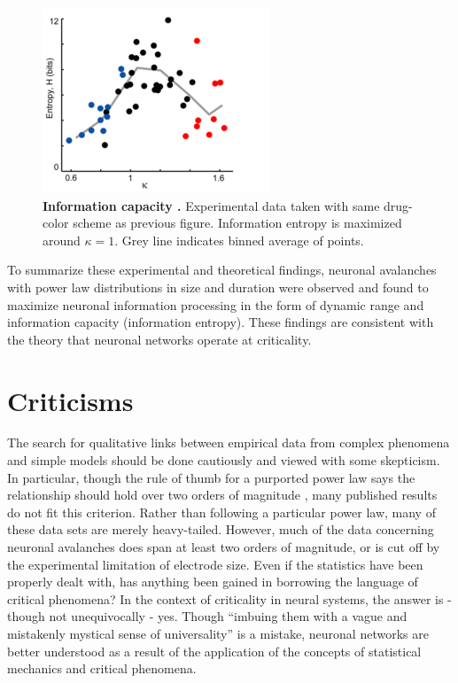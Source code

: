 \documentclass[12pt]{article}
\begin{document}
\begin{figure}      
  \begin{center}    
 \includegraphics[width=.50\textwidth]{entropyplenz}    
    \caption{\textbf{Information capacity \cite{Shew2011a}.} Experimental data taken with same drug-color scheme as previous figure. Information entropy is maximized around $\kappa = 1$. Grey line indicates binned average of points.}
   \label{Figure::Entropy / information maximized experimental}   
  \end{center}     
   \end{figure}

To summarize these experimental and theoretical findings, neuronal avalanches with power law distributions in size and duration were observed and found to maximize neuronal information processing in the form of dynamic range and information capacity (information entropy). These findings are consistent with the theory that neuronal networks operate at criticality. 



\section*{Criticisms} The search for qualitative links between empirical data from complex phenomena and simple models should be done cautiously and viewed with some skepticism. In particular, though the rule of thumb for a purported power law says the relationship should hold over two orders of magnitude \cite{Sethna2011a}, many published results do not fit this criterion. Rather than following a particular power law, many of these data sets are merely heavy-tailed. However, much of the data concerning neuronal avalanches does span at least two orders of magnitude, or is cut off by the experimental limitation of electrode size. Even if the statistics have been properly dealt with, has anything been gained in borrowing the language of critical phenomena? In the context of criticality in neural systems, the answer is - though not unequivocally - yes. Though ``imbuing them with a vague and mistakenly mystical sense of universality'' \cite{Stumpf2012a} is a mistake, neuronal networks are better understood as a result of the application of the concepts of statistical mechanics and critical phenomena. 
\end{document}
